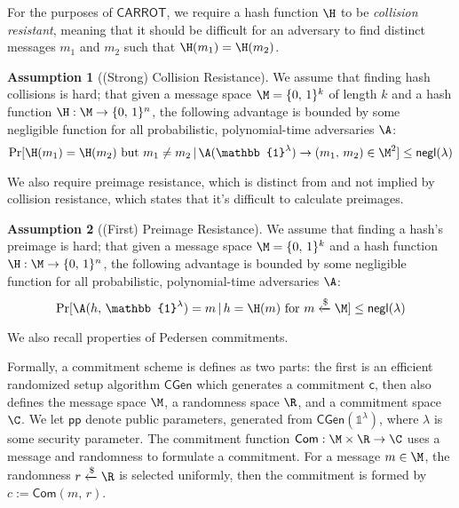 \documentclass{article}
\theoremstyle{definition}
\newtheorem{assumption}{Assumption}
\newcommand{\6}{\mathbf}
\newcommand{\7}{\mathcal}
\newcommand{\rar}{\rightarrow}
\newcommand{\lsamp}{\xleftarrow{\$}}
\newcommand{\one}{\mathbb{1}}
\renewcommand{\sf}[1]{{\mathsf{#1}}}
\begin{document}
For the purposes of $\sf{CARROT}$, we require a hash function $\H$ to be \textit{collision resistant}, meaning that it should be difficult for an adversary to find distinct messages $m_1$ and $m_2$ such that $\H(m_1)=\H(m_2)$.

\begin{assumption}[(Strong) Collision Resistance]\label{ass:CR}
    We assume that finding hash collisions is hard; that given a message space $\M=\{0, \, 1\}^k$ of length $k$ and a hash function $\H:\M \rar \{0, \, 1\}^n$, the following advantage is bounded by some negligible function for all probabilistic, polynomial-time adversaries $\A$:
    $$ \text{Pr}[ \H(m_1)=\H(m_2) \text{ but } m_1 \neq m_2 \, | \, \A (\one^\lambda) \rar (m_1, \, m_2) \in \M^2 ] \leq \mathsf{negl}(\lambda)$$
\end{assumption}

We also require preimage resistance, which is distinct from and not implied by collision resistance, which states that it's difficult to calculate preimages. 

\begin{assumption}[(First) Preimage Resistance]\label{ass:PR}
    We assume that finding a hash's preimage is hard; that given a message space $\M=\{0, \, 1\}^k$ and a hash function $\H: \M \rar \{0, \, 1\}^n$, the following advantage is bounded by some negligible function for all probabilistic, polynomial-time adversaries $\A$:
    $$ \text{Pr}[ \A(h, \, \one^\lambda) = m \, | \, h = \H(m) \text{ for } m \lsamp \M ] \leq \mathsf{negl}(\lambda)$$
\end{assumption}

\medskip 

We also recall properties of Pedersen commitments.

\medskip 

Formally, a commitment scheme is defines as two parts: the first is an efficient randomized setup algorithm $\mathsf{CGen}$ which generates a commitment $\sf{c}$, then also defines the message space $\M$, a randomness space $\R$, and a commitment space $\C$. 
We let $\sf{pp}$ denote public parameters, generated from $\mathsf{CGen}(\one^\lambda)$, where $\lambda$ is some security parameter. 
The commitment function $\mathsf{Com}: \M \times \R \rar \C$ uses a message and randomness to formulate a commitment. For a message $m \in \M$, the randomness $r \xleftarrow{\$} \R$ is selected uniformly, then the commitment is formed by $c := \mathsf{Com}(m, \, r)$.
\end{document}
